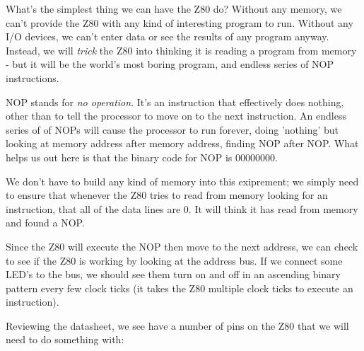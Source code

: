 What's the simplest thing we can have the Z80 do? Without any memory, we can't provide the Z80 with any kind of interesting program to run. Without any I/O devices, we can't enter data or see the results of any program anyway. Instead, we will \textit{trick} the Z80 into thinking it is reading a program from memory - but it will be the world's most boring program, and endless series of NOP instructions.

NOP stands for \textit{no operation}. It's an instruction that effectively does nothing, other than to tell the processor to move on to the next instruction. An endless series of of NOPs will cause the processor to run forever, doing 'nothing' but looking at memory address after memory address, finding NOP after NOP. What helps us out here is that the binary code for NOP is 00000000.

We don't have to build any kind of memory into this exiprement; we simply need to ensure that whenever the Z80 tries to read from memory looking for an instruction, that all of the data lines are 0. It will think it has read from memory and found a NOP.

Since the Z80 will execute the NOP then move to the next address, we can check to see if the Z80 is working by looking at the address bus. If we connect some LED's to the bus, we should see them turn on and off in an ascending binary pattern every few clock ticks (it takes the Z80 multiple clock ticks to execute an instruction).

Reviewing the datasheet, we see have a number of pins on the Z80 that we will need to do something with:

